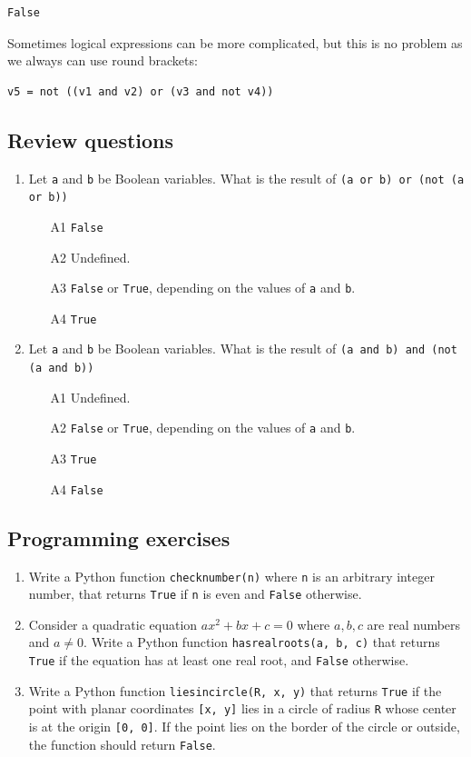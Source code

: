 \begin{verbatim}
False
\end{verbatim}
Sometimes logical expressions can be more complicated, but this is no problem
as we always can use round brackets: 

\begin{verbatim}
v5 = not ((v1 and v2) or (v3 and not v4))
\end{verbatim}

\subsection{Review questions}

\begin{enumerate}
\item Let {\tt a} and {\tt b} be Boolean variables. What is the 
result of {\tt (a or b) or (not (a or b))}
\begin{enumerate}
\item[A1] {\tt False}
\item[A2] Undefined.
\item[A3] {\tt False} or {\tt True}, depending on the values of {\tt a} and {\tt b}.
\item[A4] {\tt True}
\end{enumerate}
\item Let {\tt a} and {\tt b} be Boolean variables. What is the 
result of {\tt (a and b) and (not (a and b))}
\begin{enumerate}
\item[A1] Undefined.
\item[A2] {\tt False} or {\tt True}, depending on the values of {\tt a} and {\tt b}.
\item[A3] {\tt True}
\item[A4] {\tt False}
\end{enumerate}
\end{enumerate}

\subsection{Programming exercises}

\begin{enumerate}
\item Write a Python function {\tt checknumber(n)} where {\tt n} is an arbitrary 
      integer number, that returns {\tt True} if {\tt n} is even and {\tt False}
      otherwise.
\item Consider a quadratic equation $ax^2 + bx + c = 0$ where $a, b, c$ are real numbers 
      and $a \not = 0$. Write a Python function 
      {\tt hasrealroots(a, b, c)} that returns {\tt True} if the equation has 
      at least one real root, and {\tt False} otherwise.
\item Write a Python function {\tt liesincircle(R, x, y)} that returns {\tt True} if 
      the point with planar coordinates {\tt [x, y]} lies in a circle of radius {\tt R}
      whose center is at the origin {\tt [0, 0]}. If the point lies on the border of the 
      circle or outside, the function should return {\tt False}.
\end{enumerate}

